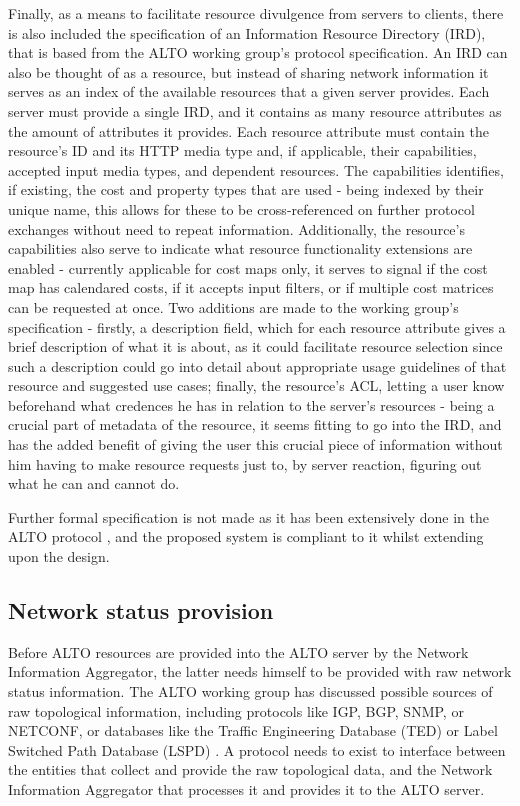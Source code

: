     Finally, as a means to facilitate resource divulgence from servers to clients, there is also included the specification of an Information Resource Directory (IRD), that is based from the ALTO working group's protocol specification.
    An IRD can also be thought of as a resource, but instead of sharing network information it serves as an index of the available resources that a given server provides.
    Each server must provide a single IRD, and it contains as many resource attributes as the amount of attributes it provides.
    Each resource attribute must contain the resource's ID and its HTTP media type and, if applicable, their capabilities, accepted input media types, and dependent resources.
    The capabilities identifies, if existing, the cost and property types that are used - being indexed by their unique name, this allows for these to be cross-referenced on further protocol exchanges without need to repeat information.
    Additionally, the resource's capabilities also serve to indicate what resource functionality extensions are enabled - currently applicable for cost maps only, it serves to signal if the cost map has calendared costs, if it accepts input filters, or if multiple cost matrices can be requested at once.
    Two additions are made to the working group's specification - firstly, a description field, which for each resource attribute gives a brief description of what it is about, as it could facilitate resource selection since such a description could go into detail about appropriate usage guidelines of that resource and suggested use cases; finally, the resource's ACL, letting a user know beforehand what credences he has in relation to the server's resources - being a crucial part of metadata of the resource, it seems fitting to go into the IRD, and has the added benefit of giving the user this crucial piece of information without him having to make resource requests just to, by server reaction, figuring out what he can and cannot do.

    Further formal specification is not made as it has been extensively done in the ALTO protocol \cite{alto-protocol}, and the proposed system is compliant to it whilst extending upon the design.

\subsection{Network status provision}

    Before ALTO resources are provided into the ALTO server by the Network Information Aggregator, the latter needs himself to be provided with raw network status information.
    The ALTO working group has discussed possible sources of raw topological information, including protocols like IGP, BGP, SNMP, or NETCONF, or databases like the Traffic Engineering Database (TED) or Label Switched Path Database (LSPD) \cite{alto-deployment-considerations}.
    A protocol needs to exist to interface between the entities that collect and provide the raw topological data, and the Network Information Aggregator that processes it and provides it to the ALTO server.


